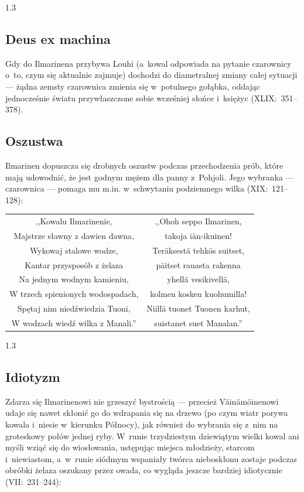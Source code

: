 \documentclass[11pt,a4paper,twoside]{report}
\begin{document}
\begin{spacing}{1.3}
\vspace*{0.5\baselineskip}
\subsection*{Deus ex machina}

Gdy do Ilmarinena przybywa Louhi (a~kowal odpowiada na pytanie czarownicy o~to, czym się aktualnie zajmuje) dochodzi do diametralnej zmiany całej sytuacji --- żądna zemsty czarownica zmienia się w~potulnego gołąbka, oddając jednocześnie światu przywłaszczone sobie wcześniej słońce i~księżyc (XLIX:~351--378).
\vspace*{\baselineskip}
\newpage
\subsection*{Oszustwa}

Ilmarinen dopuszcza się drobnych oszustw podczas przechodzenia prób, które mają udowodnić, że jest godnym mężem dla panny z~Pohjoli. Jego wybranka --- czarownica --- pomaga mu m.in. w~schwytaniu podziemnego wilka (XIX:~121--128):
\end{spacing}
{\centering
\small
\begin{longtable}{c c}
,,Kowalu Ilmarinenie, & ,,Ohoh seppo Ilmarinen, \\
Majstrze sławny z dawien dawna, & takoja iän-ikuinen! \\
Wykowaj stalowe wodze, & Teräksestä tehkös suitset, \\
Kantar przysposób z żelaza & päitset rauasta rakenna \\
Na jednym wodnym kamieniu, & yhellä vesikivellä, \\
W trzech spienionych wodospadach, & kolmen kosken kuohumilla! \\
Spętaj nim niedźwiedzia Tuoni, & Niillä tuonet Tuonen karhut, \\
W wodzach wiedź wilka z Manali.''  & suistanet suet Manalan.'' \\
\end{longtable}
}
\begin{spacing}{1.3}
\vspace*{0.5\baselineskip}
\subsection*{Idiotyzm}

Zdarza się Ilmarinenowi nie grzeszyć bystrością --- przecież Väinämöinenowi udaje się nawet skłonić go do wdrapania się na drzewo (po czym wiatr porywa kowala i~niesie w~kierunku Północy), jak również do wybrania się z~nim na groteskowy połów jednej ryby. W~runie trzydziestym dziewiątym wielki kowal ani myśli wziąć się do wiosłowania, ustępując miejsca młodzieży, starcom i~niewiastom, a~w~runie siódmym wspaniały twórca nieboskłonu zostaje podczas obróbki żelaza oszukany przez owada, co wygląda jeszcze bardziej idiotycznie (VII:~231--244):
\end{spacing}
\end{document}
